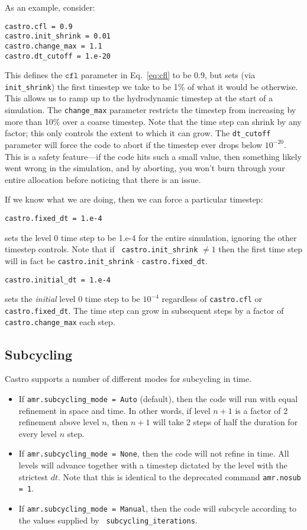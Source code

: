 As an example, consider:
\begin{lstlisting}
castro.cfl = 0.9 
castro.init_shrink = 0.01 
castro.change_max = 1.1
castro.dt_cutoff = 1.e-20
\end{lstlisting}
This defines the $\mathtt{cfl}$ parameter in Eq.~\ref{eq:cfl} to be 0.9,
but sets (via {\tt init\_shrink}) the first timestep we take
to be 1\% of what it would be otherwise.  This allows us to
ramp up to the hydrodynamic timestep at the start of a simulation.
The {\tt change\_max} parameter restricts the timestep from increasing
by more than 10\% over a coarse timestep.    Note that the time step
can shrink by any factor; this only controls the extent to which it can grow.
The {\tt dt\_cutoff} parameter will force the code to abort if the
timestep ever drops below $10^{-20}$.  This is a safety feature---if the
code hits such a small value, then something likely went wrong in the
simulation, and by aborting, you won't burn through your entire allocation
before noticing that there is an issue.

If we know what we are doing, then we can force a particular timestep:
\begin{lstlisting}
castro.fixed_dt = 1.e-4
\end{lstlisting}
sets the level 0 time step to be 1.e-4 for the entire simulation,
ignoring the other timestep controls.  Note that if {\tt
castro.init\_shrink} $\neq 1$ then the first time step will in fact be
{\tt castro.init\_shrink} $\cdot$ {\tt castro.fixed\_dt}.
\begin{lstlisting}
castro.initial_dt = 1.e-4
\end{lstlisting}
sets the {\it initial} level 0 time step to be $10^{-4}$ regardless of 
{\tt castro.cfl} or {\tt castro.fixed\_dt}.  The time step can
grow in subsequent steps by a factor of {\tt castro.change\_max} each step.


\subsection{Subcycling}
Castro supports a number of different modes for subcycling in time.

\begin{itemize}
\item If {\tt amr.subcycling\_mode = Auto} (default), then the code 
will run with equal refinement in space and time. In other words, if 
level $n+1$ is a factor of 2 refinement above level $n$, then $n+1$ 
will take 2 steps of half the duration for every level $n$ step.

\item If {\tt amr.subcycling\_mode = None}, then the code 
will not refine in time. All levels will advance together with a 
timestep dictated by the level with the strictest $dt$. Note that this 
is identical to the deprecated command {\tt amr.nosub = 1}.

\item If {\tt amr.subcycling\_mode = Manual}, then the code will 
subcycle according to the values supplied by {\tt 
subcycling\_iterations}.

\end{itemize}

